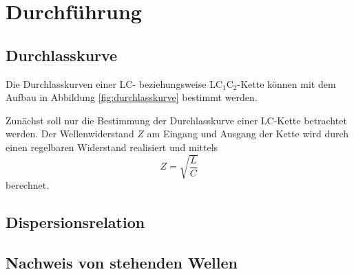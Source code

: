 \section{Durchführung}
\label{sec:Durchführung}

\subsection{Durchlasskurve}
Die Durchlasskurven einer LC- beziehungsweise LC$_1$C$_2$-Kette können
mit dem Aufbau in Abbildung \ref{fig:durchlasskurve} bestimmt werden.

Zunächst soll nur die Bestimmung der Durchlasskurve einer LC-Kette betrachtet werden.
Der Wellenwiderstand $Z$ am Eingang und Ausgang der Kette wird durch einen
regelbaren Widerstand realisiert und mittels
\begin{equation}
	Z = \sqrt{\frac{L}{C}}
\end{equation}
berechnet.



\subsection{Dispersionsrelation}

\subsection{Nachweis von stehenden Wellen}
